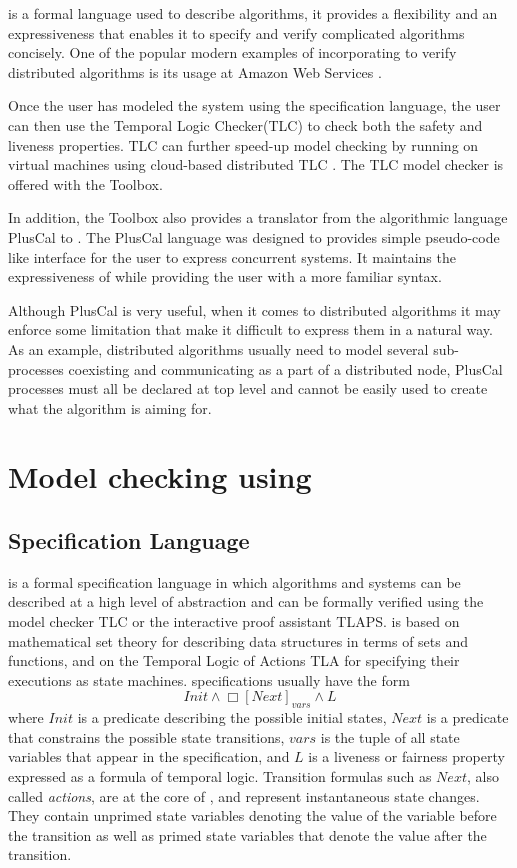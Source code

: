 \tlaplus is a formal language used to describe algorithms, it provides a flexibility and an expressiveness that enables it to specify and verify complicated algorithms concisely. One of the popular modern examples of incorporating \tlaplus to verify distributed algorithms is its usage at Amazon Web Services \cite{amazon}.

Once the user has modeled the system using the \tlaplus specification language, the user can then use the Temporal Logic Checker(TLC) to check both the safety and liveness properties. TLC can further speed-up model checking by running on virtual machines using cloud-based distributed TLC \cite{cloudTLC}. The TLC model checker is offered with the \tlaplus Toolbox. 

In addition, the \tlaplus Toolbox also provides a translator from the algorithmic language PlusCal to \tlaplus. The PlusCal language was designed to provides simple pseudo-code like interface for the user to express concurrent systems. It maintains the expressiveness of \tlaplus while providing the user with a more familiar syntax.

Although PlusCal is very useful, when it comes to distributed algorithms it may enforce some limitation that make it difficult to express them in a natural way. As an example, distributed algorithms usually need to model several sub-processes coexisting and communicating as a part of a distributed node, PlusCal processes must all be declared at top level and cannot be easily used to create what the algorithm is aiming for. 


\section{Model checking using \tlaplus}

\subsection{\tlaplus Specification Language}
is a formal specification language in which algorithms and systems can be described at a high level of abstraction and can be formally verified using the model checker TLC or the interactive proof assistant TLAPS. \tlaplus is based on mathematical set theory for describing data structures in terms of sets and functions, and on the Temporal Logic of Actions TLA for specifying their executions as state machines. \tlaplus specifications usually have the form
\[
  Init \land \Box[Next]_{vars} \land L
\]
where $Init$ is a predicate describing the possible initial states, $Next$ is a predicate that constrains the possible state transitions, $vars$ is the tuple of all state variables that appear in the specification, and $L$ is a liveness or fairness property expressed as a formula of temporal logic. Transition formulas such as $Next$, also called \emph{actions}, are at the core of \tlaplus, and represent instantaneous state changes. They contain unprimed state variables denoting the value of the variable before the transition as well as primed state variables that denote the value after the transition.

